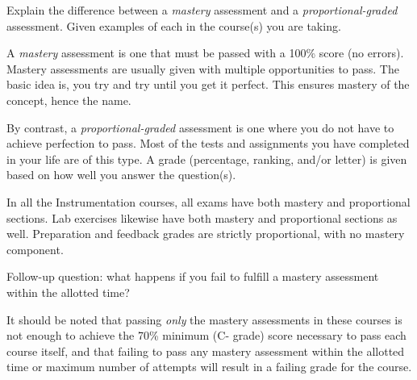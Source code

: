 

Explain the difference between a {\it mastery} assessment and a {\it proportional-graded} assessment.  Given examples of each in the course(s) you are taking.







A {\it mastery} assessment is one that must be passed with a 100\% score (no errors).  Mastery assessments are usually given with multiple opportunities to pass.  The basic idea is, you try and try until you get it perfect.  This ensures mastery of the concept, hence the name.

By contrast, a {\it proportional-graded} assessment is one where you do not have to achieve perfection to pass.  Most of the tests and assignments you have completed in your life are of this type.  A grade (percentage, ranking, and/or letter) is given based on how well you answer the question(s).

\vskip 10pt

In all the Instrumentation courses, all exams have both mastery and proportional sections.  Lab exercises likewise have both mastery and proportional sections as well.  Preparation and feedback grades are strictly proportional, with no mastery component.

\vskip 10pt

Follow-up question: what happens if you fail to fulfill a mastery assessment within the allotted time?







It should be noted that passing {\it only} the mastery assessments in these courses is not enough to achieve the 70\% minimum (C- grade) score necessary to pass each course itself, and that failing to pass any mastery assessment within the allotted time or maximum number of attempts will result in a failing grade for the course.




